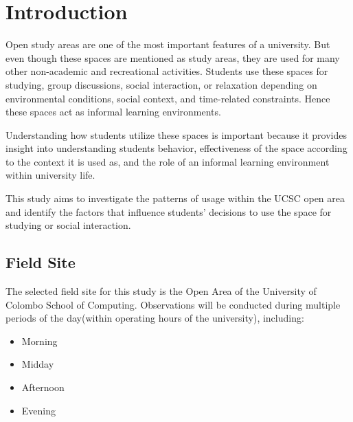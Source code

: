 \documentclass[12pt]{report}
\begin{document}


\chapter{Introduction}

Open study areas are one of the most important features of a university. But even though these spaces are mentioned as study areas, they are used for many other non-academic and recreational activities. Students use these spaces for  studying, group discussions, social interaction, or relaxation depending on environmental conditions, social context, and time-related constraints. Hence these spaces act as informal learning environments.

Understanding how students utilize these spaces is important because it provides insight into understanding students behavior, effectiveness of the space according to the context it is used as, and the role of an informal learning environment within university life. 

This study aims to investigate the patterns of usage within the UCSC open area and identify the factors that influence students' decisions to use the space for studying or social interaction.
\section*{Field Site}

The selected field site for this study is the Open Area of the University of Colombo School of Computing. Observations will be conducted during multiple periods of the day(within operating hours of the university), including:

\begin{itemize}
    \item Morning
    \item Midday
    \item Afternoon
    \item Evening 
\end{itemize}
\end{document}

